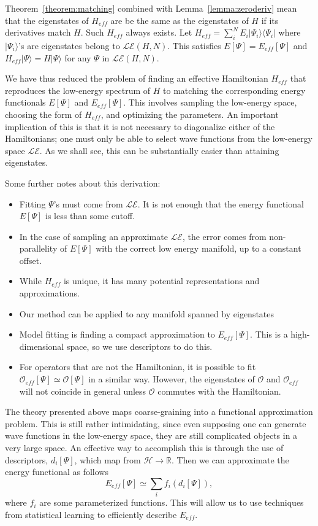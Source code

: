 Theorem~\ref{theorem:matching} combined with Lemma~\ref{lemma:zeroderiv} mean that the eigenstates of $H_{eff}$ are be the same as the eigenstates of $H$ if its derivatives match $H$. 
Such $H_{eff}$ always exists. 
Let $H_{eff} = \sum_{i}^N E_i |\Psi_i\rangle \langle \Psi_i|$ where $|\Psi_i\rangle$'s are eigenstates belong to $\mathcal{LE}(H,N)$. This satisfies $E[\Psi] = E_{eff}[\Psi]$ and $H_{eff}|\Psi\rangle = H |\Psi \rangle$ for any $\Psi$ in $\mathcal{LE}(H,N)$.  

We have thus reduced the problem of finding an effective Hamiltonian $H_{eff}$ that reproduces the low-energy spectrum of $H$ to matching the corresponding energy functionals $E[\Psi]$ and $E_{eff}[\Psi]$. 
This involves sampling the low-energy space, choosing the form of $H_{eff}$, and optimizing the parameters.
An important implication of this is that it is not necessary to diagonalize either of the Hamiltonians; one must only be able to select wave functions from the low-energy space $\mathcal{LE}$.
As we shall see, this can be substantially easier than attaining eigenstates.

Some further notes about this derivation:
\begin{itemize}
\item Fitting $\Psi$'s must come from $\mathcal{LE}$. It is not enough that the energy functional $E[\Psi]$ is less than some cutoff.
\item In the case of sampling an approximate $\mathcal{LE}$, the error comes from non-parallelity of $E[\Psi]$ with the correct low energy manifold, up to a constant offset.
\item While $H_{eff}$ is unique, it has many potential representations and approximations. 
\item Our method can be applied to any manifold spanned by eigenstates
\item Model fitting is finding a compact approximation to $E_{eff}[\Psi]$. This is a high-dimensional space, so we use descriptors to do this.	
\item For operators that are not the Hamiltonian, it is possible to fit $\mathcal{O}_{eff}[\Psi] \simeq {\mathcal O}[\Psi]$ in a similar way. However, the eigenstates of ${\mathcal O}$ and ${\mathcal O}_{eff}$ will not coincide in general unless $\mathcal{O}$ commutes with the Hamiltonian.
\end{itemize}


The theory presented above maps coarse-graining into a functional approximation problem. 
This is still rather intimidating, since even supposing one can generate wave functions in the low-energy space, they are still complicated objects in a very large space.
An effective way to accomplish this is through the use of descriptors, $d_i[\Psi]$, which map from ${\mathcal H} \rightarrow \mathbb{R}$.
Then we can approximate the energy functional as follows
\begin{equation}
E_{eff}[\Psi] \simeq \sum_i f_i(d_i[\Psi]),
\end{equation}
where $f_i$ are some parameterized functions.
This will allow us to use techniques from statistical learning to efficiently describe $E_{eff}$. 
